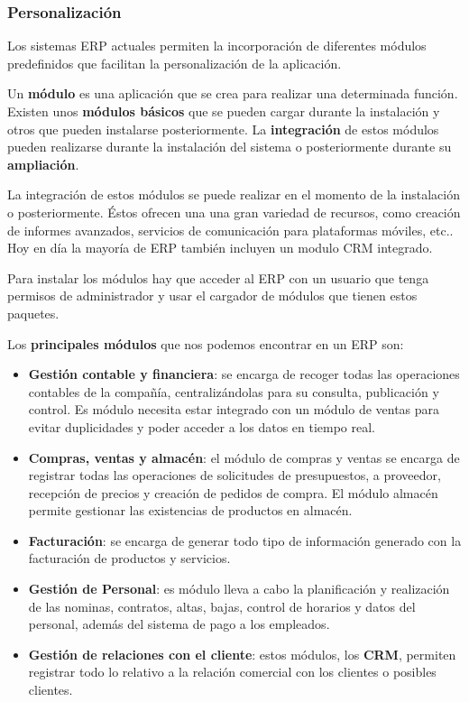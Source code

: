 \subsubsection{Personalización}
Los sistemas ERP actuales permiten la incorporación de diferentes módulos predefinidos que facilitan la personalización de la aplicación.

Un \textbf{módulo} es una aplicación que se crea para realizar una determinada función. Existen unos \textbf{módulos básicos} que se pueden cargar durante la instalación y otros que pueden instalarse posteriormente. La \textbf{integración} de estos módulos pueden realizarse durante la instalación del sistema o posteriormente durante su \textbf{ampliación}.

La integración de estos módulos se puede realizar en el momento de la instalación o posteriormente. Éstos ofrecen una una gran variedad de recursos, como creación de informes avanzados, servicios de comunicación para plataformas móviles, etc.. Hoy en día la mayoría de ERP también incluyen un modulo CRM integrado.

Para instalar los módulos hay que acceder al ERP con un usuario que tenga permisos de administrador y usar el cargador de módulos que tienen estos paquetes.

Los \textbf{principales módulos} que nos podemos encontrar en un ERP son:

\begin{itemize}
    \item \textbf{Gestión contable y financiera}: se encarga de recoger todas las operaciones contables de la compañía, centralizándolas para su consulta, publicación y control. Es módulo necesita estar integrado con un módulo de ventas para evitar duplicidades y poder acceder a los datos en tiempo real.
    \item \textbf{Compras, ventas y almacén}: el módulo de compras y ventas se encarga de registrar todas las operaciones de solicitudes de presupuestos, a proveedor, recepción de precios y creación de pedidos de compra. El módulo almacén permite gestionar las existencias de productos en almacén.
    \item \textbf{Facturación}: se encarga de generar todo tipo de información generado con la facturación de productos y servicios.
    \item \textbf{Gestión de Personal}: es módulo lleva a cabo la planificación y realización de las nominas, contratos, altas, bajas, control de horarios y datos del personal, además del sistema de pago a los empleados.
    \item \textbf{Gestión de relaciones con el cliente}: estos módulos, los \textbf{CRM}, permiten registrar todo lo relativo a la relación comercial con los clientes o posibles clientes.
\end{itemize}

